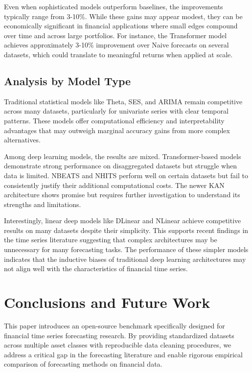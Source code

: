\documentclass{article}
\begin{document}
Even when sophisticated models outperform baselines, the improvements typically range from 3-10\%. While these gains may appear modest, they can be economically significant in financial applications where small edges compound over time and across large portfolios. For instance, the Transformer model achieves approximately 3-10\% improvement over Naive forecasts on several datasets, which could translate to meaningful returns when applied at scale.

\subsection{Analysis by Model Type}

Traditional statistical models like Theta, SES, and ARIMA remain competitive across many datasets, particularly for univariate series with clear temporal patterns. These models offer computational efficiency and interpretability advantages that may outweigh marginal accuracy gains from more complex alternatives.

Among deep learning models, the results are mixed. Transformer-based models demonstrate strong performance on disaggregated datasets but struggle when data is limited. NBEATS and NHITS perform well on certain datasets but fail to consistently justify their additional computational costs. The newer KAN architecture shows promise but requires further investigation to understand its strengths and limitations.

Interestingly, linear deep models like DLinear and NLinear achieve competitive results on many datasets despite their simplicity. This supports recent findings in the time series literature suggesting that complex architectures may be unnecessary for many forecasting tasks. The performance of these simpler models indicates that the inductive biases of traditional deep learning architectures may not align well with the characteristics of financial time series.

\section{Conclusions and Future Work}
\label{sec:conclusion}

This paper introduces an open-source benchmark specifically designed for financial time series forecasting research. By providing standardized datasets across multiple asset classes with reproducible data cleaning procedures, we address a critical gap in the forecasting literature and enable rigorous empirical comparison of forecasting methods on financial data.
\end{document}

